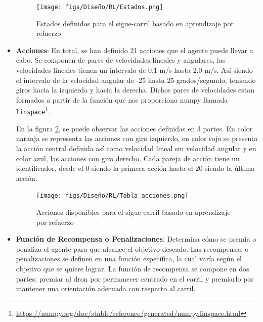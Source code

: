 \begin{itemize}
    \begin{figure} [H]
      \begin{center}
        \texttt{[image: figs/Diseño/RL/Estados.png]}
      \end{center}
      \caption{Estados definidos para el sigue-carril basado en aprendizaje por refuerzo}
      \label{fig:Estados}
      \vspace{-1.5em}
    \end{figure}

    \item \textbf{Acciones}: En total, se han definido 21 acciones que el agente puede llevar a cabo. Se componen de pares de velocidades lineales y angulares, las velocidades lineales
    tienen un intervalo de 0.1 m/s hasta 2.0 m/s. Así siendo el intervalo de la velocidad angular de -25 hasta 25 grados/segundo, teniendo giros hacia la izquierda y hacia la derecha. Dichos pares
    de velocidades estan formados a partir de la función que nos proporciona numpy llamada \texttt{linspace}\footnote{\url{https://numpy.org/doc/stable/reference/generated/numpy.linspace.html}}. 

    En la figura \ref{fig:Acciones}, se puede observar las acciones definidas en 3 partes. En color naranja se representa las acciones con giro izquierdo, en color rojo se presenta 
    la acción central definida así como velocidad lineal sin velocidad angular y en color azul, las acciones con giro derecho. Cada pareja de acción tiene un identificador, desde el 0
    siendo la primera acción hasta el 20 siendo la última acción.
  
    \begin{figure} [H]
      \begin{center}
        \texttt{[image: figs/Diseño/RL/Tabla\_acciones.png]}
      \end{center}
      \caption{Acciones disponibles para el sigue-carril basado en aprendizaje por refuerzo}
      \label{fig:Acciones}
      \vspace{-1.5em}
    \end{figure}
  
    \item \textbf{Función de Recompensa o Penalizaciones}: Determina cómo se premia o penaliza el agente para que alcance el objetivo deseado. Las recompensas o penalizaciones
    se definen en una función específica, la cual varía según el objetivo que se quiere lograr. La función de recompensa se compone en dos partes: premiar al dron por permanecer 
    centrado en el carril y premiarlo por mantener una orientación adecuada con respecto al carril. 


\end{itemize}

